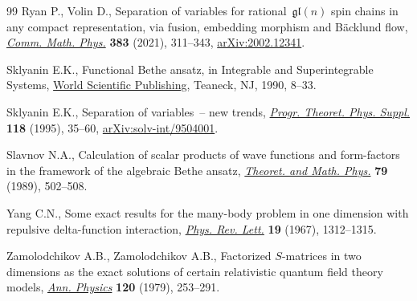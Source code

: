 \documentclass[10pt,a4paper]{amsart}
\theoremstyle{definition}
\begin{document}
\begin{thebibliography}{99}
Ryan P., Volin D., Separation of variables for rational~{$\mathfrak{gl}(n)$}
 spin chains in any compact representation, via fusion, embedding morphism and
 {B}\"acklund flow,
 \href{https://doi.org/10.1007/s00220-021-03990-7}{\textit{Comm. Math. Phys.}}
 \textbf{383} (2021), 311--343,
 \href{http://arxiv.org/abs/2002.12341}{arXiv:2002.12341}.

Sklyanin E.K., Functional {B}ethe ansatz, in Integrable and {S}uperintegrable
 {S}ystems, \href{https://doi.org/10.1142/9789812797179_0002}{World Scientific
 Publishing}, Teaneck, NJ, 1990, 8--33.

Sklyanin E.K., Separation of variables~-- new trends,
 \href{https://doi.org/10.1143/PTPS.118.35}{\textit{Progr. Theoret. Phys.
 Suppl.}} \textbf{118} (1995), 35--60,
 \href{http://arxiv.org/abs/solv-int/9504001}{arXiv:solv-int/9504001}.

Slavnov N.A., Calculation of scalar products of wave functions and form-factors
 in the framework of the algebraic {B}ethe ansatz,
 \href{https://doi.org/10.1007/BF01016531}{\textit{Theoret. and Math. Phys.}}
 \textbf{79} (1989), 502--508.

Yang C.N., Some exact results for the many-body problem in one dimension with
 repulsive delta-function interaction,
 \href{https://doi.org/10.1103/PhysRevLett.19.1312}{\textit{Phys. Rev. Lett.}}
 \textbf{19} (1967), 1312--1315.

Zamolodchikov A.B., Zamolodchikov A.B., Factorized {$S$}-matrices in two
 dimensions as the exact solutions of certain relativistic quantum field
 theory models,
 \href{https://doi.org/10.1016/0003-4916(79)90391-9}{\textit{Ann. Physics}}
 \textbf{120} (1979), 253--291.

\end{thebibliography}
\end{document}
